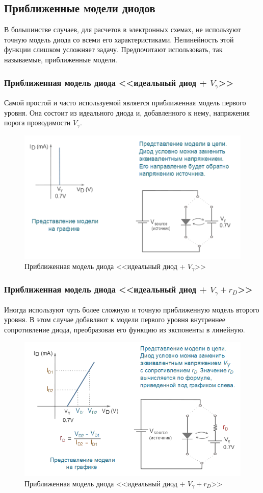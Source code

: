 \documentclass[a4paper,14pt]{article}
\begin{document}
\subsection{Приближенные модели диодов}

В большинстве случаев, для расчетов в электронных схемах, не используют точную модель диода со всеми его характеристиками. Нелинейность этой функции слишком усложняет задачу. Предпочитают использовать, так называемые, приближенные модели.

\subsubsection{Приближенная модель диода <<идеальный диод + $V_{\gamma}$>>}

Самой простой и часто используемой является приближенная модель первого уровня. Она состоит из идеального диода и, добавленного к нему, напряжения порога проводимости $V_{\gamma}$.

\begin{figure}[H]
	\centering
	\includegraphics[width=0.7\linewidth]{image/intro_004}
	\caption{Приближенная модель диода <<идеальный диод + $V_{\gamma}$>>}
	\label{fig:intro004}
\end{figure}

\subsubsection{Приближенная модель диода <<идеальный диод + $V_{\gamma} + r_D$>>}

Иногда используют чуть более сложную и точную приближенную модель второго уровня. В этом случае добавляют к модели первого уровня внутреннее сопротивление диода, преобразовав его функцию из экспоненты в линейную.

\begin{figure}[H]
	\centering
	\includegraphics[width=0.7\linewidth]{image/intro_005}
	\caption{Приближенная модель диода <<идеальный диод + $V_{\gamma} + r_D$>>}
	\label{fig:intro005}
\end{figure}
\end{document}

